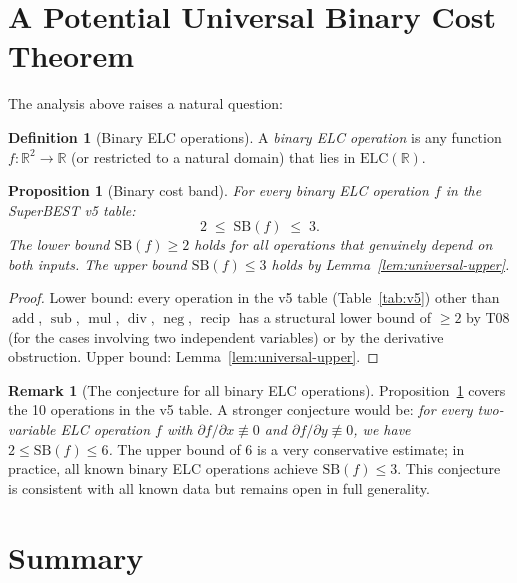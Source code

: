 \documentclass[12pt,a4paper]{article}
\newtheorem{proposition}[theorem]{Proposition}
\theoremstyle{definition}
\newtheorem{definition}[theorem]{Definition}
\newtheorem{remark}[theorem]{Remark}
\newcommand{\recip}{\operatorname{recip}}
\newcommand{\divop}{\operatorname{div}}
\newcommand{\mulop}{\operatorname{mul}}
\newcommand{\subop}{\operatorname{sub}}
\newcommand{\addop}{\operatorname{add}}
\newcommand{\negop}{\operatorname{neg}}
\newcommand{\SB}{\mathrm{SB}}
\newcommand{\ELC}{\mathrm{ELC}(\mathbb{R})}
\newcommand{\R}{\mathbb{R}}
\begin{document}
\section{A Potential Universal Binary Cost Theorem}
\label{sec:universal}

The analysis above raises a natural question:

\begin{definition}[Binary ELC operations]
A \emph{binary ELC operation} is any function $f:\R^2\to\R$ (or restricted to a
natural domain) that lies in $\ELC$.
\end{definition}

\begin{proposition}[Binary cost band]
\label{prop:band}
For every binary ELC operation $f$ in the SuperBEST v5 table:
\[
  2 \;\leq\; \SB(f) \;\leq\; 3.
\]
The lower bound $\SB(f)\geq 2$ holds for all operations that genuinely depend
on both inputs.  The upper bound $\SB(f)\leq 3$ holds by
Lemma~\ref{lem:universal-upper}.
\end{proposition}

\begin{proof}
Lower bound: every operation in the v5 table (Table~\ref{tab:v5}) other than
$\addop$, $\subop$, $\mulop$, $\divop$, $\negop$, $\recip$ has a structural
lower bound of $\geq 2$ by T08 (for the cases involving two independent variables)
or by the derivative obstruction.
Upper bound: Lemma~\ref{lem:universal-upper}.
\end{proof}

\begin{remark}[The conjecture for all binary ELC operations]
Proposition~\ref{prop:band} covers the 10 operations in the v5 table.
A stronger conjecture would be: \emph{for every two-variable ELC operation
$f$ with $\partial f/\partial x \not\equiv 0$ and $\partial f/\partial y\not\equiv 0$,
we have $2\leq\SB(f)\leq 6$.}
The upper bound of 6 is a very conservative estimate; in practice, all known
binary ELC operations achieve $\SB(f)\leq 3$.
This conjecture is consistent with all known data but remains open in full generality.
\end{remark}

\section{Summary}
\label{sec:summary}
\end{document}
